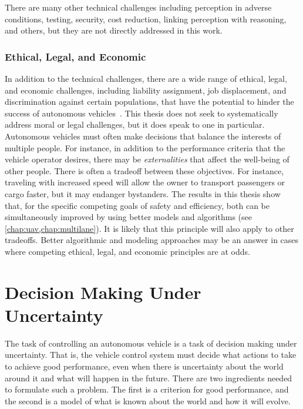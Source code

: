 There are many other technical challenges including perception in adverse conditions, testing, security, cost reduction, linking perception with reasoning, and others, but they are not directly addressed in this work.

\subsubsection{Ethical, Legal, and Economic}

In addition to the technical challenges, there are a wide range of ethical, legal, and economic challenges, including liability assignment, job displacement, and discrimination against certain populations, that have the potential to hinder the success of autonomous vehicles~\cite{casey2016amoral}.
This thesis does not seek to systematically address moral or legal challenges, but it does speak to one in particular.
Autonomous vehicles must often make decisions that balance the interests of multiple people.
For instance, in addition to the performance criteria that the vehicle operator desires, there may be \emph{externalities} that affect the well-being of other people.
There is often a tradeoff between these objectives.
For instance, traveling with increased speed will allow the owner to transport passengers or cargo faster, but it may endanger bystanders.
The results in this thesis show that, for the specific competing goals of safety and efficiency, both can be simultaneously improved by using better models and algorithms (see \cref{chap:uav,chap:multilane}).
It is likely that this principle will also apply to other tradeoffs.
Better algorithmic and modeling approaches may be an answer in cases where competing ethical, legal, and economic principles are at odds.

% 

\section{Decision Making Under Uncertainty}

The task of controlling an autonomous vehicle is a task of decision making under uncertainty.
That is, the vehicle control system must decide what actions to take to achieve good performance, even when there is uncertainty about the world around it and what will happen in the future.
There are two ingredients needed to formulate such a problem.
The first is a criterion for good performance, and the second is a model of what is known about the world and how it will evolve.

